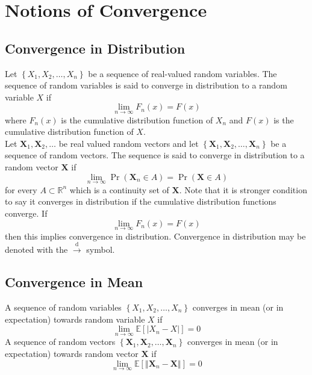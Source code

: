\documentclass[11pt]{report} %
\begin{document}
\section{Notions of Convergence}

\subsection{Convergence in Distribution}

Let $\left\{X_{1}, X_{2}, \dots, X_{n} \right\}$ be a sequence of real-valued random variables. The sequence of random variables is said to converge in distribution to a random variable $X$ if
\begin{equation}
\lim_{n\to \infty}F_{n}\left(x\right) = F\left(x\right)
\end{equation}
where $F_{n}\left(x\right)$ is the cumulative distribution function of $X_{n}$ and $F\left(x\right)$ is the cumulative distribution function of $X$. \\

Let $\mathbf{X}_{1}, \mathbf{X}_{2}, \dots$ be real valued random vectors and let $\left\{\mathbf{X}_{1}, \mathbf{X}_{2}, \dots, \mathbf{X}_{n} \right\}$ be a sequence of random vectors. The sequence is said to converge in distribution to a random vector $\mathbf{X}$ if
\begin{equation}
\lim_{n\to\infty}\operatorname{Pr}\left(\mathbf{X}_{n}\in A\right) = \operatorname{Pr}\left(\mathbf{X}\in A\right)
\end{equation}
for every $A\subset \mathbb{R}^{n}$ which is a continuity set of $\mathbf{X}$. Note that it is stronger condition to say it converges in distribution if the cumulative distribution functions converge. If 
\begin{equation}
\lim_{n\to \infty}F_{n}\left(x\right) = F\left(x\right)
\end{equation}
then this implies convergence in distribution. Convergence in distribution may be denoted with the $\overset{\mathrm{d}}\to$ symbol.

\subsection{Convergence in Mean}

A sequence of random variables $\left\{X_{1}, X_{2}, \dots, X_{n} \right\}$ converges in mean (or in expectation) towards random variable $X$ if
\begin{equation}
\lim_{n\to\infty}\mathbb{E}\left[\left|X_{n} - X\right|\right] = 0
\end{equation}
A sequence of random vectors $\left\{\mathbf{X}_{1}, \mathbf{X}_{2}, \dots, \mathbf{X}_{n} \right\}$ converges in mean (or in expectation) towards random vector $\mathbf{X}$ if
\begin{equation}
\lim_{n\to\infty}\mathbb{E}\left[\left\Vert\mathbf{X}_{n} - \mathbf{X}\right\Vert\right] = 0
\end{equation}
\end{document}
